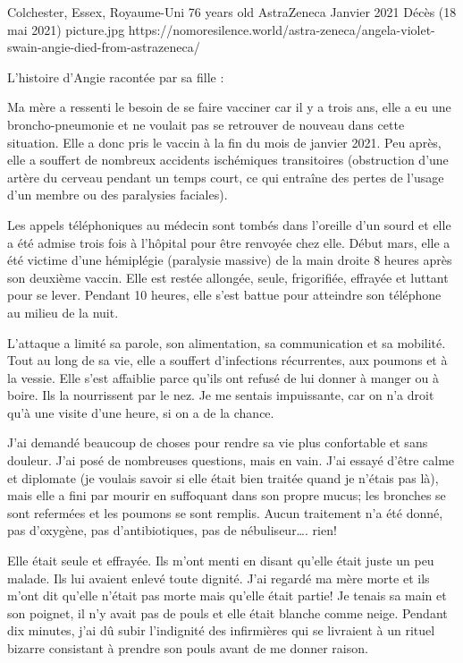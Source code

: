 {Colchester, Essex, Royaume-Uni}
{76 years old}
{AstraZeneca}
{Janvier 2021}
{Décès (18 mai 2021)}
{picture.jpg}
{https://nomoresilence.world/astra-zeneca/angela-violet-swain-angie-died-from-astrazeneca/}
{

L'histoire d'Angie racontée par sa fille :

Ma mère a ressenti le besoin de se faire vacciner car il y a trois ans, elle a
eu une broncho-pneumonie et ne voulait pas se retrouver de nouveau dans cette
situation. Elle a donc pris le vaccin à la fin du mois de janvier 2021. Peu
après, elle a souffert de nombreux accidents ischémiques transitoires
(obstruction d’une artère du cerveau pendant un temps court, ce qui entraîne des
pertes de l’usage d’un membre ou des paralysies faciales).

Les appels téléphoniques au médecin sont tombés dans l'oreille d'un sourd et
elle a été admise trois fois à l'hôpital pour être renvoyée chez elle. Début
mars, elle a été victime d'une hémiplégie (paralysie massive) de la main droite
8 heures après son deuxième vaccin. Elle est restée allongée, seule,
frigorifiée, effrayée et luttant pour se lever. Pendant 10 heures, elle s'est
battue pour atteindre son téléphone au milieu de la nuit.

L'attaque a limité sa parole, son alimentation, sa communication et sa
mobilité. Tout au long de sa vie, elle a souffert d'infections récurrentes, aux
poumons et à la vessie. Elle s'est affaiblie parce qu'ils ont refusé de lui
donner à manger ou à boire. Ils la nourrissent par le nez. Je me sentais
impuissante, car on n'a droit qu'à une visite d'une heure, si on a de la chance.

J'ai demandé beaucoup de choses pour rendre sa vie plus confortable et sans
douleur. J'ai posé de nombreuses questions, mais en vain. J'ai essayé d'être
calme et diplomate (je voulais savoir si elle était bien traitée quand je
n'étais pas là), mais elle a fini par mourir en suffoquant dans son propre
mucus; les bronches se sont refermées et les poumons se sont remplis. Aucun
traitement n'a été donné, pas d'oxygène, pas d'antibiotiques, pas de
nébuliseur…. rien!

Elle était seule et effrayée. Ils m'ont menti en disant qu'elle était juste un
peu malade. Ils lui avaient enlevé toute dignité. J'ai regardé ma mère morte et
ils m'ont dit qu'elle n'était pas morte mais qu'elle était partie! Je tenais sa
main et son poignet, il n'y avait pas de pouls et elle était blanche comme
neige. Pendant dix minutes, j'ai dû subir l'indignité des infirmières qui se
livraient à un rituel bizarre consistant à prendre son pouls avant de me donner
raison.

}
